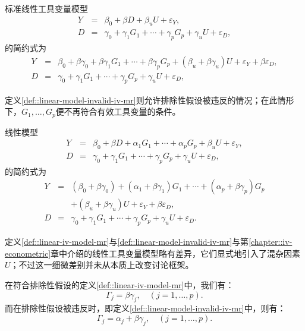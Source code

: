 \begin{definition}
[线性工具变量模型]\label{def::linear-iv-model-mr}
标准线性工具变量模型\begin{eqnarray}
Y  &=& \beta_0 +  \beta D + \beta_u U + \varepsilon_Y , \\
D  &=& \gamma_0 +   \gamma_1 G_1 + \cdots + \gamma_p G_p + \gamma_u U + \varepsilon_D ,
\end{eqnarray}的简约式为\begin{eqnarray}
Y  &=&\beta_0 +  \beta  \gamma_0 + \beta \gamma_1 G_1 + \cdots + \beta  \gamma_p G_p  + (\beta_u + \beta \gamma_u )U + \varepsilon_Y + \beta \varepsilon_D , \\
D  &=& \gamma_0 +  \gamma_1 G_1 + \cdots + \gamma_p G_p + \gamma_u U + \varepsilon_D ,
\end{eqnarray}
\end{definition}



定义\ref{def::linear-model-invalid-iv-mr}则允许排除性假设被违反的情况；在此情形下，$G_1, \ldots, G_p$便不再符合有效工具变量的条件。 


\begin{definition}
[可能存在无效工具变量的线性模型]\label{def::linear-model-invalid-iv-mr}
线性模型\begin{eqnarray}
Y  &=& \beta_0 + \beta D + \alpha_1 G_1 + \cdots + \alpha_p G_p  + \beta_u U + \varepsilon_Y ,   \\
D  &=& \gamma_0 + \gamma_1 G_1 + \cdots + \gamma_p G_p + \gamma_u U + \varepsilon_D ,
\end{eqnarray}的简约式为\begin{eqnarray}
Y  &=& ( \beta_0 +\beta  \gamma_0 ) +  (\alpha_1 + \beta \gamma_1)  G_1 + \cdots + (\alpha_p +  \beta  \gamma_p) G_p \nonumber  \\
&&+  ( \beta_u + \beta \gamma_u )  U + \varepsilon_Y + \beta \varepsilon_D ,   \\
D  &=& \gamma_0 +  \gamma_1 G_1 + \cdots + \gamma_p G_p + \gamma_u U + \varepsilon_D .
\end{eqnarray}
\end{definition}

定义\ref{def::linear-iv-model-mr}与\ref{def::linear-model-invalid-iv-mr}与第\ref{chapter::iv-econometric}章中介绍的线性工具变量模型略有差异，它们显式地引入了混杂因素$U$；不过这一细微差别并未从本质上改变讨论框架。 


在符合排除性假设的定义\ref{def::linear-iv-model-mr}中，我们有：
$$
\Gamma_j = \beta \gamma_j,\quad (j=1,\ldots,p).
$$
而在排除性假设被违反时，即定义\ref{def::linear-model-invalid-iv-mr}中，则有：
$$
\Gamma_j = \alpha_j +   \beta \gamma_j,\quad (j=1,\ldots,p). 
$$



